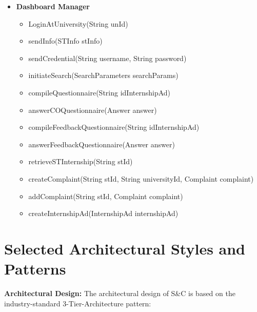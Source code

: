 \begin{itemize}
      \item \textbf{Dashboard Manager}
          \begin{itemize}
              \item LoginAtUniversity(String unId)
              \item sendInfo(STInfo stInfo)
              \item sendCredential(String username, String password)
              \item initiateSearch(SearchParameters searchParams)
              \item compileQuestionnaire(String idInternshipAd)
              \item answerCOQuestionnaire(Answer answer)
              \item compileFeedbackQuestionnaire(String idInternshipAd)
              \item answerFeedbackQuestionnaire(Answer answer)
              \item retrieveSTInternship(String stId)
              \item createComplaint(String stId, String universityId, Complaint complaint)
              \item addComplaint(String stId, Complaint complaint)
              \item createInternshipAd(InternshipAd internshipAd)
          \end{itemize}
  
  \end{itemize}

\section{Selected Architectural Styles and Patterns}
\label{sec:selected-architectural-styles-patterns}%

\par{\textbf{Architectural Design:}} The architectural design of S\&C is based on the industry-standard 3-Tier-Architecture pattern:

